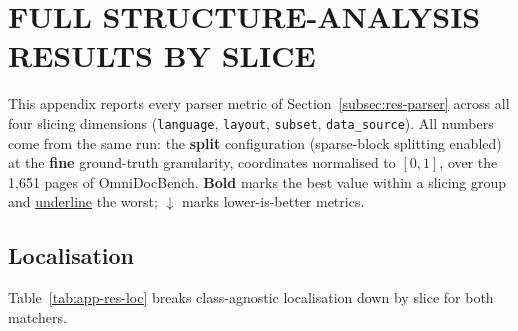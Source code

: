 \section{FULL STRUCTURE-ANALYSIS RESULTS BY SLICE}
\label{app:parser-slices}

This appendix reports every parser metric of Section~\ref{subsec:res-parser}
across all four slicing dimensions (\texttt{language}, \texttt{layout},
\texttt{subset}, \texttt{data\_source}). All numbers come from the same run: the
\textbf{split} configuration (sparse-block splitting enabled) at the
\textbf{fine} ground-truth granularity, coordinates normalised to $[0,1]$, over
the 1{,}651 pages of OmniDocBench. \textbf{Bold} marks the best value within a
slicing group and \underline{underline} the worst; $\downarrow$ marks
lower-is-better metrics.

\subsection{Localisation}

Table~\ref{tab:app-res-loc} breaks class-agnostic localisation down by slice for
both matchers.

